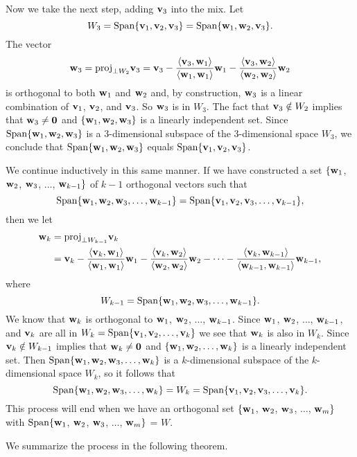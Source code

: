 Now we take the next step, adding $\mathbf{v}_3$ into the mix. Let 
\[W_3 = \text{Span}\{\mathbf{v}_1,\mathbf{v}_2,\mathbf{v}_3\} = \text{Span}\{\mathbf{w}_1, \mathbf{w}_2, \mathbf{v}_3\}.\] 
The vector
\[\mathbf{w}_3 = \text{proj}_{\perp W_2} \mathbf{v}_3 = \mathbf{v}_3 - \frac{\langle \mathbf{v}_3, \mathbf{w}_1 \rangle}{\langle \mathbf{w}_1, \mathbf{w}_1 \rangle} \mathbf{w}_1 - \frac{\langle \mathbf{v}_3, \mathbf{w}_2 \rangle}{\langle \mathbf{w}_2, \mathbf{w}_2 \rangle} \mathbf{w}_2\]
is orthogonal to both $\mathbf{w}_1$ and $\mathbf{w}_2$ and, by construction, $\mathbf{w}_3$ is a linear combination of $\mathbf{v}_1$, $\mathbf{v}_2$, and $\mathbf{v}_3$. So $\mathbf{w}_3$ is in $W_3$. The fact that $\mathbf{v}_3 \notin W_2$ implies that $\mathbf{w}_3 \neq \mathbf{0}$ and $\{\mathbf{w}_1, \mathbf{w}_2, \mathbf{w}_3\}$ is a linearly independent set. Since $\text{Span}\{\mathbf{w}_1, \mathbf{w}_2, \mathbf{w}_3\}$ is a 3-dimensional subspace of the 3-dimensional space $W_3$, we conclude that $\text{Span}\{\mathbf{w}_1, \mathbf{w}_2, \mathbf{w}_3\}$ equals $\text{Span}\{\mathbf{v}_1,\mathbf{v}_2,\mathbf{v}_3\}$.

We continue inductively in this same manner. If we have constructed a set $\{\mathbf{w}_1$, $\mathbf{w}_2$, $\mathbf{w}_3$, $\ldots$, $\mathbf{w}_{k-1}\}$ of $k-1$ orthogonal vectors such that \[\text{Span}\{\mathbf{w}_1, \mathbf{w}_2, \mathbf{w}_3, \ldots, \mathbf{w}_{k-1}\} = \text{Span}\{\mathbf{v}_1,\mathbf{v}_2,\mathbf{v}_3, \ldots, \mathbf{v}_{k-1}\},\]
then we let
\begin{align*}
\mathbf{w}_{k} &= \text{proj}_{\perp W_{k-1}} \mathbf{v}_k \\
	&= \mathbf{v}_k - \displaystyle \frac{\langle \mathbf{v}_k, \mathbf{w}_1 \rangle}{\langle \mathbf{w}_1, \mathbf{w}_1 \rangle} \mathbf{w}_1 - \frac{\langle \mathbf{v}_k, \mathbf{w}_2 \rangle}{\langle \mathbf{w}_2, \mathbf{w}_2 \rangle} \mathbf{w}_2 - \cdots - \frac{\langle \mathbf{v}_k, \mathbf{w}_{k-1} \rangle}{\langle \mathbf{w}_{k-1}, \mathbf{w}_{k-1} \rangle} \mathbf{w}_{k-1},
\end{align*}
where 
\[W_{k-1} = \text{Span}\{\mathbf{w}_1, \mathbf{w}_2, \mathbf{w}_3, \ldots, \mathbf{w}_{k-1}\}.\]
We know that $\mathbf{w}_k$ is orthogonal to $\mathbf{w}_1$, $\mathbf{w}_2$, $\ldots$, $\mathbf{w}_{k-1}$. Since $\mathbf{w}_1$, $\mathbf{w}_2$, $\ldots$, $\mathbf{w}_{k-1}$, and $\mathbf{v}_k$ are all in $W_k = \text{Span}\{\mathbf{v}_1, \mathbf{v}_2, \ldots, \mathbf{v}_k\}$ we see that $\mathbf{w}_k$ is also in $W_k$. Since $\mathbf{v}_k \notin W_{k-1}$ implies that $\mathbf{w}_k \neq \mathbf{0}$ and $\{\mathbf{w}_1, \mathbf{w}_2, \ldots, \mathbf{w}_k\}$ is a linearly independent set. Then $\text{Span}\{\mathbf{w}_1, \mathbf{w}_2, \mathbf{w}_3, \ldots, \mathbf{w}_{k}\}$ is a $k$-dimensional subspace of the $k$-dimensional space $W_k$, so it follows that 
\[\text{Span}\{\mathbf{w}_1, \mathbf{w}_2, \mathbf{w}_3, \ldots, \mathbf{w}_{k}\} = W_k = \text{Span}\{\mathbf{v}_1,\mathbf{v}_2,\mathbf{v}_3, \ldots, \mathbf{v}_{k}\}.\] 
This process will end when we have an orthogonal set $\{\mathbf{w}_1$, $\mathbf{w}_2$, $\mathbf{w}_3$, $\ldots$, $\mathbf{w}_{m}\}$ with $\text{Span}\{\mathbf{w}_1$, $\mathbf{w}_2$, $\mathbf{w}_3$, $\ldots$, $\mathbf{w}_{m}\}$ = $W$.

We summarize the process in the following theorem.

